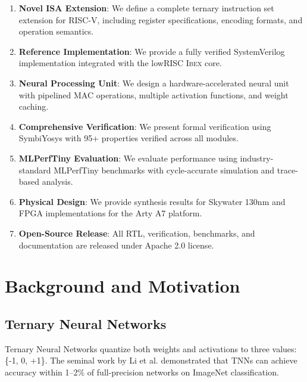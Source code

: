 \documentclass[conference,10pt]{IEEEtran}
\newcommand{\ibex}{\textsc{Ibex}}
\newcommand{\riscv}{RISC-V}
\begin{document}
\begin{enumerate}
    \item \textbf{Novel ISA Extension}: We define a complete ternary instruction set extension for \riscv{}, including register specifications, encoding formats, and operation semantics.
    
    \item \textbf{Reference Implementation}: We provide a fully verified SystemVerilog implementation integrated with the lowRISC \ibex{} core.
    
    \item \textbf{Neural Processing Unit}: We design a hardware-accelerated neural unit with pipelined MAC operations, multiple activation functions, and weight caching.
    
    \item \textbf{Comprehensive Verification}: We present formal verification using SymbiYosys with 95+ properties verified across all modules.
    
    \item \textbf{MLPerfTiny Evaluation}: We evaluate performance using industry-standard MLPerfTiny benchmarks with cycle-accurate simulation and trace-based analysis.
    
    \item \textbf{Physical Design}: We provide synthesis results for Skywater 130nm and FPGA implementations for the Arty A7 platform.
    
    \item \textbf{Open-Source Release}: All RTL, verification, benchmarks, and documentation are released under Apache 2.0 license.
\end{enumerate}

\section{Background and Motivation}
\label{sec:background}

\subsection{Ternary Neural Networks}

Ternary Neural Networks quantize both weights and activations to three values: \{-1, 0, +1\}. The seminal work by Li et al. \cite{li2016ternary} demonstrated that TNNs can achieve accuracy within 1--2\% of full-precision networks on ImageNet classification.
\end{document}
